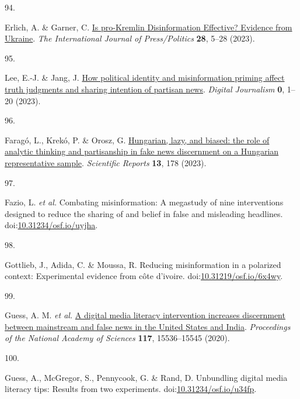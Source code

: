 \documentclass[
  doc,floatsintext]{apa6}
\newlength{\cslhangindent}
\newlength{\csllabelwidth}
\newenvironment{CSLReferences}[2] %
 {\begin{list}{}{%
  \setlength{\itemindent}{0pt}
  \setlength{\leftmargin}{0pt}
  \setlength{\parsep}{0pt}
  \ifodd #1
   \setlength{\leftmargin}{\cslhangindent}
   \setlength{\itemindent}{-1\cslhangindent}
  \fi
  \setlength{\itemsep}{#2\baselineskip}}}
 {\end{list}}
\newcommand{\CSLLeftMargin}[1]{\parbox[t]{\csllabelwidth}{\strut#1\strut}}
\newcommand{\CSLRightInline}[1]{\parbox[t]{\linewidth - \csllabelwidth}{\strut#1\strut}}
\begin{document}
\begin{CSLReferences}{0}{0}
\CSLLeftMargin{94. }%
\CSLRightInline{*Erlich, A. \& Garner, C. \href{https://doi.org/10.1177/19401612211045221}{Is pro-Kremlin Disinformation Effective? Evidence from Ukraine}. \emph{The International Journal of Press/Politics} \textbf{28}, 5--28 (2023).}

\CSLLeftMargin{95. }%
\CSLRightInline{*Lee, E.-J. \& Jang, J. \href{https://doi.org/10.1080/21670811.2022.2163413}{How political identity and misinformation priming affect truth judgments and sharing intention of partisan news}. \emph{Digital Journalism} \textbf{0}, 1--20 (2023).}

\CSLLeftMargin{96. }%
\CSLRightInline{*Faragó, L., Krekó, P. \& Orosz, G. \href{https://doi.org/10.1038/s41598-022-26724-8}{Hungarian, lazy, and biased: the role of analytic thinking and partisanship in fake news discernment on a Hungarian representative sample}. \emph{Scientific Reports} \textbf{13}, 178 (2023).}

\CSLLeftMargin{97. }%
\CSLRightInline{*Fazio, L. \emph{et al.} Combating misinformation: A megastudy of nine interventions designed to reduce the sharing of and belief in false and misleading headlines. doi:\href{https://doi.org/10.31234/osf.io/uyjha}{10.31234/osf.io/uyjha}.}

\CSLLeftMargin{98. }%
\CSLRightInline{*Gottlieb, J., Adida, C. \& Moussa, R. Reducing misinformation in a polarized context: Experimental evidence from côte d{'}ivoire. doi:\href{https://doi.org/10.31219/osf.io/6x4wy}{10.31219/osf.io/6x4wy}.}

\CSLLeftMargin{99. }%
\CSLRightInline{*Guess, A. M. \emph{et al.} \href{https://doi.org/10.1073/pnas.1920498117}{A digital media literacy intervention increases discernment between mainstream and false news in the United States and India}. \emph{Proceedings of the National Academy of Sciences} \textbf{117}, 15536--15545 (2020).}

\CSLLeftMargin{100. }%
\CSLRightInline{*Guess, A., McGregor, S., Pennycook, G. \& Rand, D. Unbundling digital media literacy tips: Results from two experiments. doi:\href{https://doi.org/10.31234/osf.io/u34fp}{10.31234/osf.io/u34fp}.}


\end{CSLReferences}
\end{document}
